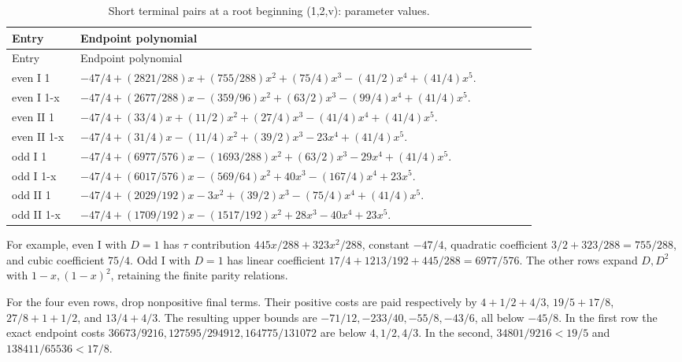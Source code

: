 \begingroup\small
\setlength{\tabcolsep}{3pt}
\setlength{\LTleft}{0pt}\setlength{\LTright}{\fill}
\begin{longtable}{@{}p{0.1200\linewidth}p{0.8000\linewidth}@{}}
\caption{Short terminal pairs at a root beginning (1,2,v): parameter values.}\label{tab:parameters:q5-c160:4}\\
\toprule
Entry & Endpoint polynomial \\
\midrule\endfirsthead
\toprule
Entry & Endpoint polynomial \\
\midrule\endhead
\bottomrule\endfoot
even I 1 & \(-47/4+(2821/288)x+(755/288)x^2+(75/4)x^3-(41/2)x^4+(41/4)x^5\). \\
\addlinespace[2pt]
even I 1-x & \(-47/4+(2677/288)x-(359/96)x^2+(63/2)x^3-(99/4)x^4+(41/4)x^5\). \\
\addlinespace[2pt]
even II 1 & \(-47/4+(33/4)x+(11/2)x^2+(27/4)x^3-(41/4)x^4+(41/4)x^5\). \\
\addlinespace[2pt]
even II 1-x & \(-47/4+(31/4)x-(11/4)x^2+(39/2)x^3-23x^4+(41/4)x^5\). \\
\addlinespace[2pt]
odd I 1 & \(-47/4+(6977/576)x-(1693/288)x^2+(63/2)x^3-29x^4+(41/4)x^5\). \\
\addlinespace[2pt]
odd I 1-x & \(-47/4+(6017/576)x-(569/64)x^2+40x^3-(167/4)x^4+23x^5\). \\
\addlinespace[2pt]
odd II 1 & \(-47/4+(2029/192)x-3x^2+(39/2)x^3-(75/4)x^4+(41/4)x^5\). \\
\addlinespace[2pt]
odd II 1-x & \(-47/4+(1709/192)x-(1517/192)x^2+28x^3-40x^4+23x^5\). \\
\end{longtable}
\endgroup


For example, even I with \(D=1\) has \(\tau\) contribution \(445x/288+323x^2/288\), constant \(-47/4\), quadratic coefficient \(3/2+323/288=755/288\), and cubic coefficient \(75/4\). Odd I with \(D=1\) has linear coefficient \(17/4+1213/192+445/288=6977/576\). The other rows expand \(D,\allowbreak \allowbreak  D^2\) with \(1-x,\allowbreak \allowbreak (1-x)^2\), retaining the finite parity relations.

For the four even rows, drop nonpositive final terms. Their positive costs are paid respectively by \(4+1/2+4/3\), \(19/5+17/8\), \(27/8+1+1/2\), and \(13/4+4/3\). The resulting upper bounds are \(-71/12,\allowbreak \allowbreak -233/40,\allowbreak \allowbreak -55/8,\allowbreak \allowbreak -43/6\), all below \(-45/8\). In the first row the exact endpoint costs \(36673/9216,\allowbreak \allowbreak  127595/294912,\allowbreak \allowbreak  164775/131072\) are below \(4,\allowbreak \allowbreak  1/2,\allowbreak \allowbreak  4/3\). In the second, \(34801/9216<19/5\) and \(138411/65536<17/8\).

